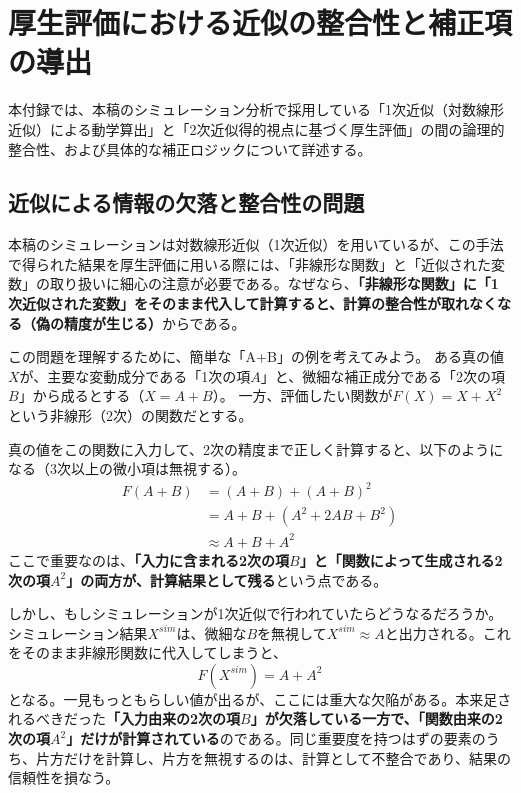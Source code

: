 
\chapter{厚生評価における近似の整合性と補正項の導出}
\label{chap:appendix_welfare_correction}

本付録では、本稿のシミュレーション分析で採用している「1次近似（対数線形近似）による動学算出」と「2次近似得的視点に基づく厚生評価」の間の論理的整合性、および具体的な補正ロジックについて詳述する。

\section{近似による情報の欠落と整合性の問題}
\label{sec:appendix_welfare_correction_consistency}

本稿のシミュレーションは対数線形近似（1次近似）を用いているが、この手法で得られた結果を厚生評価に用いる際には、「非線形な関数」と「近似された変数」の取り扱いに細心の注意が必要である。なぜなら、\textbf{「非線形な関数」に「1次近似された変数」をそのまま代入して計算すると、計算の整合性が取れなくなる（偽の精度が生じる）}からである。

この問題を理解するために、簡単な「A+B」の例を考えてみよう。
ある真の値\(X\)が、主要な変動成分である「1次の項\(A\)」と、微細な補正成分である「2次の項\(B\)」から成るとする（\(X=A+B\)）。
一方、評価したい関数が\(F(X)=X+X^2\)という非線形（2次）の関数だとする。

真の値をこの関数に入力して、2次の精度まで正しく計算すると、以下のようになる（3次以上の微小項は無視する）。
\begin{equation}
\begin{aligned}
F(A+B)&=(A+B)+(A+B)^2 \\
&=A+B+(A^2+2AB+B^2) \\
&\approx A+B+A^2
\end{aligned}
\label{eq:appendix_welfare_correction_consistency_logic_example}
\end{equation}
ここで重要なのは、\textbf{「入力に含まれる2次の項\(B\)」と「関数によって生成される2次の項\(A^2\)」の両方が、計算結果として残る}という点である。

しかし、もしシミュレーションが1次近似で行われていたらどうなるだろうか。シミュレーション結果\(X^{sim}\)は、微細な\(B\)を無視して\(X^{sim}\approx A\)と出力される。これをそのまま非線形関数に代入してしまうと、
\begin{equation}
F(X^{sim})=A+A^2
\label{eq:appendix_welfare_correction_consistency_logic_inconsistent}
\end{equation}
となる。一見もっともらしい値が出るが、ここには重大な欠陥がある。本来足されるべきだった\textbf{「入力由来の2次の項\(B\)」が欠落している一方で、「関数由来の2次の項\(A^2\)」だけが計算されている}のである。同じ重要度を持つはずの要素のうち、片方だけを計算し、片方を無視するのは、計算として不整合であり、結果の信頼性を損なう。



